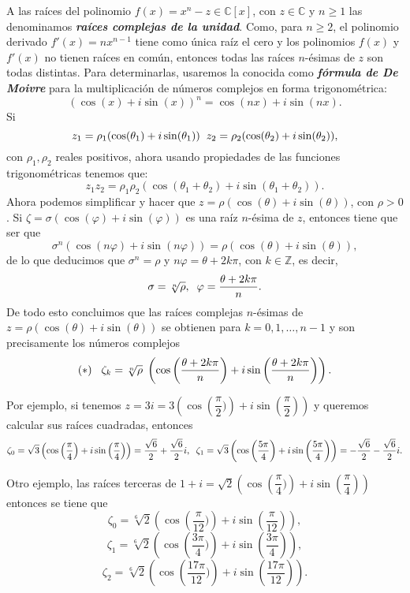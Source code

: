 \documentclass[12pt]{article}
\begin{document}
A las raíces del polinomio $f(x) = x^{n}-z \in \mathbb{C}[x]$, con $z \in \mathbb{C}$ y $n \geq 1$ las denominamos \textbf{\textit{raíces complejas de la unidad}}. Como, para $n \geq 2$, el polinomio derivado $f'(x) = nx^{n-1}$ tiene como única raíz el cero y los polinomios $f(x)$ y $f'(x)$ no tienen raíces en común, entonces todas las raíces $n$-ésimas de $z$ son todas distintas. Para determinarlas, usaremos la conocida como \textbf{\textit{fórmula de De Moivre}} para la multiplicación de números complejos en forma trigonométrica: $$(\cos(x) + i\sin(x))^{n} = \cos(nx) + i\sin(nx).$$ Si $$z_{1} = \rho_{1}(\cos (\theta_{1}) +i\sin (\theta_{1})) \hspace{0.2cm}z_{2} = \rho_{2}(\cos (\theta_{2}) +i\sin (\theta_{2})),$$ con $\rho_{1}, \rho_{2}$ reales positivos, ahora usando propiedades de las funciones trigonométricas tenemos que:
$$z_{1}z_{2} = \rho_{1}\rho_{2}(\cos(\theta_{1} + \theta_{2}) + i \sin(\theta_{1} + \theta_{2})).$$ Ahora podemos simplificar y hacer que $z = \rho (\cos(\theta) + i\sin(\theta))$, con $\rho > 0$. Si $\zeta = \sigma (\cos(\varphi) + i\sin(\varphi)) $ es una raíz $n$-ésima de $z$, entonces tiene que ser que $$\sigma^{n}(\cos(n\varphi) + i\sin(n\varphi)) = \rho (\cos(\theta)+ i\sin(\theta)),$$ de lo que deducimos que $\sigma^{n} = \rho$ y $n\varphi = \theta +2k\pi$, con $k \in \mathbb{Z}$, es decir, $$\sigma = \sqrt[n]{\rho}, \hspace{0.2cm} \varphi = \dfrac{\theta+2k\pi}{n}.$$
De todo esto concluimos que las raíces complejas $n$-ésimas de $z = \rho(\cos(\theta) + i\sin(\theta))$ se obtienen para $k = 0, 1, \ldots, n-1$ y son precisamente los números complejos $$ (\ast) \hspace{0.3cm}\zeta_{k} = \sqrt[n]{\rho} \hspace{0.1cm}\left(\cos\left(\dfrac{\theta+2k\pi}{n}\right) + i\sin\left(\dfrac{\theta+2k\pi}{n}\right)\right).$$

Por ejemplo, si tenemos $z = 3i= 3\left(\cos \left( \dfrac{\pi}{2})\right) + i\sin \left( \dfrac{\pi}{2} \right)\right)$ y queremos calcular sus raíces cuadradas, entonces $$\zeta_{0} = \sqrt{3} \left( \cos \left( \dfrac{\pi}{4}\right) + i \sin \left( \dfrac{\pi}{4}\right)\right) = \dfrac{\sqrt{6}}{2} + \dfrac{\sqrt{6}}{2}i, \hspace{0.2cm} \zeta_{1} = \sqrt{3}\left( \cos \left( \dfrac{5 \pi}{4}\right) + i \sin \left( \dfrac{5 \pi}{4}\right)\right) =- \dfrac{\sqrt{6}}{2} - \dfrac{\sqrt{6}}{2}i.$$

Otro ejemplo, las raíces terceras de $1 + i = \sqrt{2}\left(\cos \left( \dfrac{\pi}{4})\right) + i\sin \left( \dfrac{\pi}{4} \right)\right)$ entonces se tiene que $$ \zeta_{0} = \sqrt[6]{2}\left(\cos \left( \dfrac{\pi}{12})\right) + i\sin \left( \dfrac{\pi}{12} \right)\right),$$ $$\zeta_{1} = \sqrt[6]{2}\left(\cos \left( \dfrac{3 \pi}{4})\right) + i\sin \left( \dfrac{3 \pi}{4} \right)\right),$$ $$\zeta_{2} = \sqrt[6]{2}\left(\cos \left( \dfrac{17 \pi}{12})\right) + i\sin \left( \dfrac{17 \pi}{12} \right)\right).$$
\end{document}
